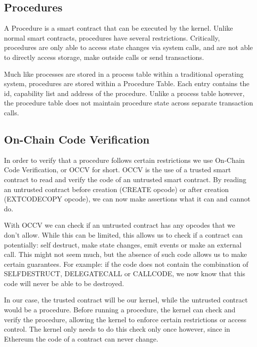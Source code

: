 \documentclass[english,a4paper]{article}
\begin{document}
\subsection{Procedures}\label{procedures}

A Procedure is a smart contract that can be executed by the kernel.
Unlike normal smart contracts, procedures have several restrictions.
Critically, procedures are only able to access state changes via system
calls, and are not able to directly access storage, make outside calls
or send transactions.

Much like processes are stored in a process table within a traditional
operating system, procedures are stored within a Procedure Table. Each
entry contains the id, capability list and address of the procedure.
Unlike a process table however, the procedure table does not maintain
procedure state across separate transaction calls.

\subsection{On-Chain Code
Verification}\label{on-chain-code-verification}

In order to verify that a procedure follows certain restrictions we use
On-Chain Code Verification, or OCCV for short. OCCV is the use of a
trusted smart contract to read and verify the code of an untrusted smart
contract. By reading an untrusted contract before creation (CREATE
opcode) or after creation (EXTCODECOPY opcode), we can now make
assertions what it can and cannot do.

With OCCV we can check if an untrusted contract has any opcodes that we
don't allow. While this can be limited, this allows us to check if a
contract can potentially: self destruct, make state changes, emit events
or make an external call. This might not seem much, but the absence of
such code allows us to make certain guarantees. For example: if the code
does not contain the combination of SELFDESTRUCT, DELEGATECALL or
CALLCODE, we now know that this code will never be able to be destroyed.

In our case, the trusted contract will be our kernel, while the
untrusted contract would be a procedure. Before running a procedure, the
kernel can check and verify the procedure, allowing the kernel to
enforce certain restrictions or access control. The kernel only needs to
do this check only once however, since in Ethereum the code of a
contract can never change.
\end{document}

